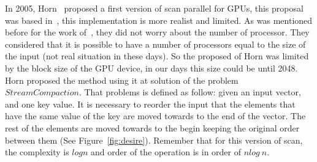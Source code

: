 \documentclass[Ingles]{ic-tese-v1}
\begin{document}
In 2005, Horn~\cite{GPUGems2} proposed a first version of scan parallel for GPUs, this proposal was based in~\cite{dataparallel}, this implementation is more realist and limited. As was mentioned before for the work of~\cite{dataparallel}, they did not worry about the number of processor. They considered that it is possible to have a number of processors equal to the size of the input (not real situation in these days).
So the proposed of Horn was limited by the block size of the GPU device, in our days this size could be until 2048. Horn proposed the method using it at solution of the problem $Stream Compaction$. That problems is defined as follow: given an input vector, and one key value. It is necessary to reorder the input that the elements that have the same value of the key are moved towards to the end of the vector. The rest of the elements are moved towards to the begin keeping the original order between them (See Figure~\ref{fig:desire}). Remember that for this version of scan, the complexity is $log n$ and order of the operation is in order of $n log\ n$.\\
\end{document}
